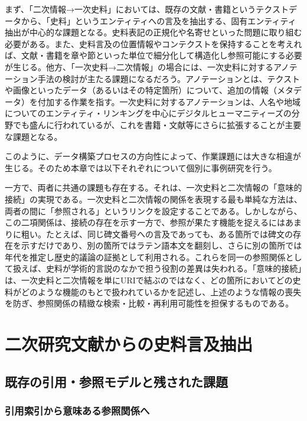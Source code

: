 まず、「二次情報→一次史料」においては、既存の文献・書籍というテクストデータから、「史料」というエンティティへの言及を抽出する、固有エンティティ抽出が中心的な課題となる。史料表記の正規化や名寄せといった問題に取り組む必要がある。また、史料言及の位置情報やコンテクストを保持することを考えれば、文献・書籍を章や節といった単位で細分化して構造化し参照可能にする必要が生じる。他方、「一次史料→二次情報」の場合には、一次史料に対するアノテーション手法の検討が主たる課題になるだろう。アノテーションとは、テクストや画像といったデータ（あるいはその特定箇所）について、追加の情報（メタデータ）を付加する作業を指す。一次史料に対するアノテーションは、人名や地域についてのエンティティ・リンキングを中心にデジタルヒューマニティーズの分野でも盛んに行われているが、これを書籍・文献等にさらに拡張することが主要な課題となる。

このように、データ構築プロセスの方向性によって、作業課題には大きな相違が生じる。そのため本章では以下それぞれについて個別に事例研究を行う。

一方で、両者に共通の課題も存在する。それは、一次史料と二次情報の「意味的接続」の実現である。一次史料と二次情報の関係を表現する最も単純な方法は、両者の間に「参照される」というリンクを設定することである。しかしながら、この二項関係は、接続の存在を示す一方で、参照が果たす機能を捉えるにはあまりに粗い。たとえば、同じ碑文番号への言及であっても、ある箇所では碑文の存在を示すだけであり、別の箇所ではラテン語本文を翻刻し、さらに別の箇所では年代を推定し歴史的議論の証拠として利用される。これらを同一の参照関係として扱えば、史料が学術的言説のなかで担う役割の差異は失われる。「意味的接続」は、一次史料と二次情報を単にURIで結ぶのではなく、どの箇所においてどの史料がどのような機能のもとで扱われているかを記述し、上述のような情報の喪失を防ぎ、参照関係の精緻な検索・比較・再利用可能性を担保するものである。

\section{二次研究文献からの史料言及抽出}

\subsection{既存の引用・参照モデルと残された課題}

\subsubsection{引用索引から意味ある参照関係へ}

